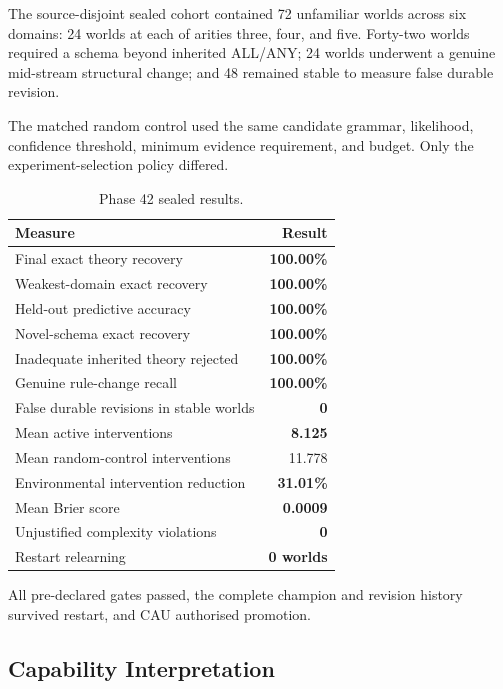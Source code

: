 The source-disjoint sealed cohort contained 72 unfamiliar worlds across six
domains: 24 worlds at each of arities three, four, and five. Forty-two worlds
required a schema beyond inherited ALL/ANY; 24 worlds underwent a genuine
mid-stream structural change; and 48 remained stable to measure false durable
revision.

The matched random control used the same candidate grammar, likelihood,
confidence threshold, minimum evidence requirement, and budget. Only the
experiment-selection policy differed.

\begin{table}[htbp]
  \centering
  \caption{Phase 42 sealed results.}
  \label{tab:phase42-results}
  \begin{tabular}{lr}
    \hline
    Measure & Result \\
    \hline
    Final exact theory recovery & \textbf{100.00\%} \\
    Weakest-domain exact recovery & \textbf{100.00\%} \\
    Held-out predictive accuracy & \textbf{100.00\%} \\
    Novel-schema exact recovery & \textbf{100.00\%} \\
    Inadequate inherited theory rejected & \textbf{100.00\%} \\
    Genuine rule-change recall & \textbf{100.00\%} \\
    False durable revisions in stable worlds & \textbf{0} \\
    Mean active interventions & \textbf{8.125} \\
    Mean random-control interventions & 11.778 \\
    Environmental intervention reduction & \textbf{31.01\%} \\
    Mean Brier score & \textbf{0.0009} \\
    Unjustified complexity violations & \textbf{0} \\
    Restart relearning & \textbf{0 worlds} \\
    \hline
  \end{tabular}
\end{table}

All pre-declared gates passed, the complete champion and revision history
survived restart, and CAU authorised promotion.

\subsection{Capability Interpretation}

